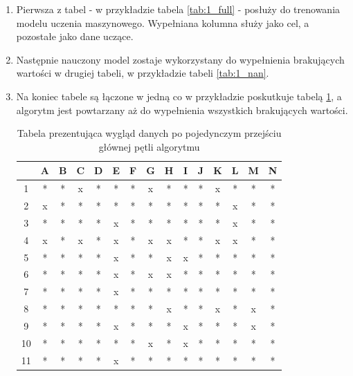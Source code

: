 \documentclass[12pt,twoside]{article}
\begin{document}
\begin{enumerate}[label=\arabic*), leftmargin=1.25cm]
    \item Pierwsza z tabel - w przykładzie tabela \ref{tab:1_full} - posłuży do trenowania modelu uczenia maszynowego.
          Wypełniana kolumna służy jako cel, a pozostałe jako dane uczące.
    \item Następnie nauczony model zostaje wykorzystany do wypełnienia brakujących wartości w drugiej tabeli,
          w przykładzie tabeli \ref{tab:1_nan}.
    \item Na koniec tabele są łączone w jedną co w przykładzie poskutkuje tabelą \ref{tab:1_end},
          a algorytm jest powtarzany aż do wypełnienia wszystkich brakujących wartości.

          \begin{table}[ht]
              \caption{Tabela prezentująca wygląd danych po pojedynczym przejściu głównej pętli algorytmu}
              \centering
              \begin{tabular}{|c|c|c|c|c|c|c|c|c|c|c|c|c|c|c|}
                  \hline
                     & A & B & C & D & E & F & G & H & I & J & K & L & M & N \\ \hline
                  1  & * & * & x & * & * & * & x & * & * & * & x & * & * & * \\ \hline
                  2  & x & * & * & * & * & * & * & * & * & * & * & x & * & * \\ \hline
                  3  & * & * & * & * & x & * & * & * & * & * & * & x & * & * \\ \hline
                  4  & x & * & x & * & x & * & x & x & * & * & x & x & * & * \\ \hline
                  5  & * & * & * & * & x & * & * & x & x & * & * & * & * & * \\ \hline
                  6  & * & * & * & * & x & * & x & x & * & * & * & * & * & * \\ \hline
                  7  & * & * & * & * & x & * & * & * & * & * & * & * & * & * \\ \hline
                  8  & * & * & * & * & * & * & * & x & * & * & x & * & x & * \\ \hline
                  9  & * & * & * & * & x & * & * & * & x & * & * & * & x & * \\ \hline
                  10 & * & * & * & * & * & * & x & * & x & * & * & * & * & * \\ \hline
                  11 & * & * & * & * & x & * & * & * & * & * & * & * & * & * \\ \hline
              \end{tabular}
              \label{tab:1_end}
          \end{table}
          \FloatBarrier
\end{enumerate}
\end{document}
